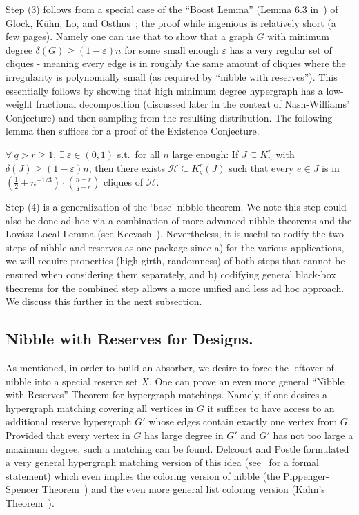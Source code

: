 \documentclass[twoside,leqno]{article}
\begin{document}
Step (3) follows from a special case of the ``Boost Lemma'' (Lemma 6.3 in~\cite{GKLO16}) of Glock, K\"{u}hn, Lo, and Osthus~\cite{GKLO16}; the proof while ingenious is relatively short (a few pages). Namely one can use that to show that a graph $G$ with minimum degree $\delta(G)\ge (1-\varepsilon)n$ for some small enough $\varepsilon$ has a very regular set of cliques - meaning every edge is in roughly the same amount of cliques where the irregularity is polynomially small (as required by ``nibble with reserves''). This essentially follows by showing that high minimum degree hypergraph has a low-weight fractional decomposition (discussed later in the context of Nash-Williams' Conjecture) and then sampling from the resulting distribution. The following lemma then suffices for a proof of the Existence Conjecture.

\begin{lemma}[Boost]\label{lem:RegBoost}
$\forall~q>r\ge 1$, $\exists~\varepsilon \in (0,1)$ s.t.~for all $n$ large enough: If $J\subseteq K_n^r$ with $\delta(J) \ge (1-\varepsilon)n$, then there exists $\mathcal{H} \subseteq K_q^r(J)$ such that every $e\in J$ is in  $\left(\frac{1}{2}\pm n^{-1/3}\right)\cdot \binom{n-r}{q-r}$ cliques of $\mathcal{H}$.
\end{lemma}

Step (4) is a generalization of the `base' nibble theorem. We note this step could also be done ad hoc via a combination of more advanced nibble theorems and the Lov\'asz Local Lemma (see Keevash~\cite{K24}). Nevertheless, it is useful to codify the two steps of nibble and reserves as one package since a) for the various applications, we will require properties (high girth, randomness) of both steps that cannot be ensured when considering them separately, and b) codifying general black-box theorems for the combined step allows a more unified and less ad hoc approach. We discuss this further in the next subsection.

\subsection{Nibble with Reserves for Designs.}

As mentioned, in order to build an absorber, we desire to force the leftover of nibble into a special reserve set $X$. One can prove an even more general ``Nibble with Reserves'' Theorem for hypergraph matchings. Namely, if one desires a hypergraph matching covering all vertices in $G$ it suffices to have access to an additional reserve hypergraph $G'$ whose edges contain exactly one vertex from $G$. Provided that every vertex in $G$ has large degree in $G'$ and $G'$ has not too large a maximum degree, such a matching can be found. Delcourt and Postle formulated a very general hypergraph matching version of this idea (see~\cite{DPI} for a formal statement) which even implies the coloring version of nibble (the Pippenger-Spencer Theorem~\cite{PS89}) and the even more general list coloring version (Kahn's Theorem~\cite{K96}). 
\end{document}

